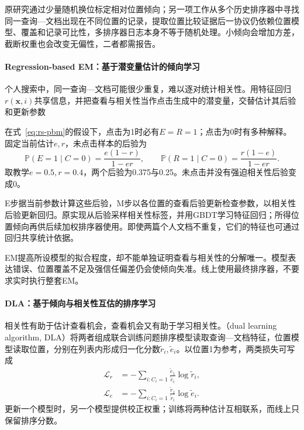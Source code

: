 原研究通过少量随机换位标定相对位置倾向；另一项工作从多个历史排序器中寻找同一查询—文档出现在不同位置的记录，提取位置比较证据后一协议仍依赖位置模型、覆盖和记录可比性，多排序器日志本身不等于随机处理。小倾向会增加方差，截断权重也会改变无偏性，二者都需报告。

\paragraph{Regression-based EM：基于潜变量估计的倾向学习}
\label{sec:rs-regression-em}

个人搜索中，同一查询—文档可能很少重复，难以逐对统计相关性。用特征回归$r(\bm x,i)$共享信息，并把查看与相关性当作点击生成中的潜变量，交替估计其后验和更新参数

在式~\eqref{eq:rs-pbm}的假设下，点击为1时必有$E=R=1$；点击为0时有多种解释。固定当前估计$e,r$，未点击样本的后验为
\begin{equation}
 \mathbb P(E=1\mid C=0)=\frac{e(1-r)}{1-er},\qquad
 \mathbb P(R=1\mid C=0)=\frac{r(1-e)}{1-er}.
 \label{eq:rs-rem-posterior}
\end{equation}
取教学$e=0.5,r=0.4$，两个后验为0.375与0.25。未点击并没有强迫相关性后验变成0。

E步据当前参数计算这些后验，M步以各位置的查看后验更新检查参数，以相关性后验更新回归。原实现从后验采样相关性标签，并用GBDT学习特征回归；所得位置倾向再供后续加权排序器使用。即使两篇个人文档不重复，它们的特征也可通过回归共享统计依据。

EM提高所设模型的拟合程度，却不能单独证明查看与相关性的分解唯一。模型表达错误、位置覆盖不足及强信任偏差仍会使倾向失准。线上使用最终排序器，不要求实时执行整套EM。

\paragraph{DLA：基于倾向与相关性互估的排序学习}
\label{sec:rs-dla}

相关性有助于估计查看机会，查看机会又有助于学习相关性。（dual learning algorithm, DLA）将两者组成联合训练问题排序模型读取查询—文档特征，位置模型读取位置，分别在列表内形成归一化分数$\widetilde r_i,\widetilde e_i$。以位置1为参考，两类损失可写成
\begin{align}
 \mathcal L_r&=-\sum_{i:C_i=1}
       \frac{\widetilde e_1}{\widetilde e_i}\log\widetilde r_i,\\
 \mathcal L_e&=-\sum_{i:C_i=1}
       \frac{\widetilde r_1}{\widetilde r_i}\log\widetilde e_i.
 \label{eq:rs-dla}
\end{align}
更新一个模型时，另一个模型提供校正权重；训练将两种估计互相联系，而线上只保留排序分数。

